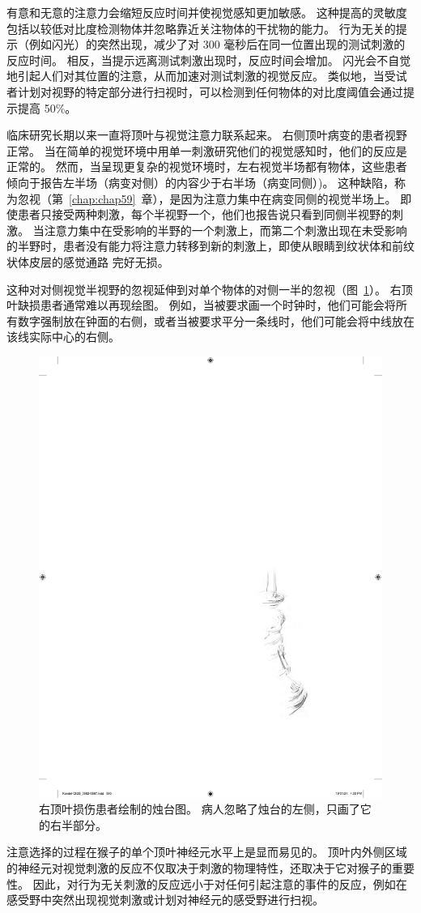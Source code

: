 有意和无意的注意力会缩短反应时间并使视觉感知更加敏感。
这种提高的灵敏度包括以较低对比度检测物体并忽略靠近关注物体的干扰物的能力。
行为无关的提示（例如闪光）的突然出现，减少了对 300 毫秒后在同一位置出现的测试刺激的反应时间。
相反，当提示远离测试刺激出现时，反应时间会增加。
闪光会不自觉地引起人们对其位置的注意，从而加速对测试刺激的视觉反应。
类似地，当受试者计划对视野的特定部分进行扫视时，可以检测到任何物体的对比度阈值会通过提示提高 50\%。


临床研究长期以来一直将顶叶与视觉注意力联系起来。
右侧顶叶病变的患者视野正常。
当在简单的视觉环境中用单一刺激研究他们的视觉感知时，他们的反应是正常的。
然而，当呈现更复杂的视觉环境时，左右视觉半场都有物体，这些患者倾向于报告左半场（病变对侧）的内容少于右半场（病变同侧）)。
这种缺陷，称为忽视（第~\ref{chap:chap59}~章），是因为注意力集中在病变同侧的视觉半场上。
即使患者只接受两种刺激，每个半视野一个，他们也报告说只看到同侧半视野的刺激。
当注意力集中在受影响的半野的一个刺激上，而第二个刺激出现在未受影响的半野时，患者没有能力将注意力转移到新的刺激上，即使从眼睛到纹状体和前纹状体皮层的感觉通路 完好无损。


这种对对侧视觉半视野的忽视延伸到对单个物体的对侧一半的忽视（图~\ref{fig:25_9}）。
右顶叶缺损患者通常难以再现绘图。
例如，当被要求画一个时钟时，他们可能会将所有数字强制放在钟面的右侧，或者当被要求平分一条线时，他们可能会将中线放在该线实际中心的右侧。


\begin{figure}[htbp]
	\centering
	\includegraphics[width=0.5\linewidth]{chap25/fig_25_9}
	\caption{右顶叶损伤患者绘制的烛台图。
		病人忽略了烛台的左侧，只画了它的右半部分。}
	\label{fig:25_9}
\end{figure}


注意选择的过程在猴子的单个顶叶神经元水平上是显而易见的。
顶叶内外侧区域的神经元对视觉刺激的反应不仅取决于刺激的物理特性，还取决于它对猴子的重要性。
因此，对行为无关刺激的反应远小于对任何引起注意的事件的反应，例如在感受野中突然出现视觉刺激或计划对神经元的感受野进行扫视。



